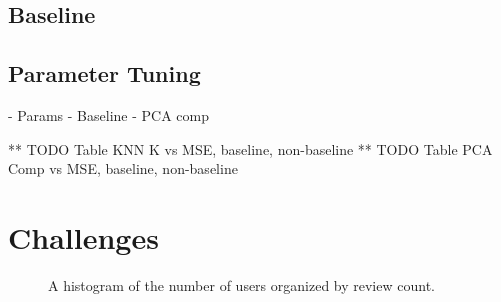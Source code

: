 \documentclass[10pt,twocolumn,letterpaper]{article}
\begin{document}
\subsection{Baseline}

\subsection{Parameter Tuning}

- Params
- Baseline
- PCA comp

** TODO Table KNN K vs MSE, baseline, non-baseline
** TODO Table PCA Comp vs MSE, baseline, non-baseline


\section{Challenges}

\begin{figure}[t]
\begin{center}
\end{center}
   \caption{A histogram of the number of users organized by review count.}
\label{fig:usrCnt}
\end{figure}
\end{document}
